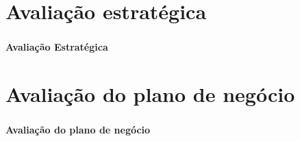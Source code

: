 \documentclass{beamer}
\begin{document}
\section{Avaliação estratégica}
\begin{frame}
  \frametitle{}
  \framesubtitle{}

  \begin{center}
    {\huge\textbf{Avaliação Estratégica}}
  \end{center}
\end{frame}

\section{Avaliação do plano de negócio}
\begin{frame}
  \frametitle{}
  \framesubtitle{}

  \begin{center}
    {\huge\textbf{Avaliação do plano de negócio}}
  \end{center}
\end{frame}
\end{document}
